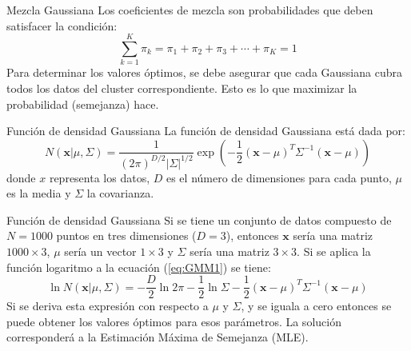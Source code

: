 \documentclass[11pt,aspectratio=169]{beamer}
\begin{document}
\begin{frame}{Mezcla Gaussiana}
Los coeficientes de mezcla son probabilidades que deben satisfacer la condición:
\begin{equation}
	\sum_{k=1}^K \pi_k = \pi_1 + \pi_2 + \pi_3 + \cdots + \pi_K = 1
\end{equation}
Para determinar los valores óptimos, se debe asegurar que cada Gaussiana cubra todos los datos del cluster correspondiente. Esto es lo que 
maximizar la probabilidad (semejanza) hace.
\end{frame}

\begin{frame}{Función de densidad Gaussiana}
La función de densidad Gaussiana está dada por:
\begin{equation}
	N(\textbf{x}|\mu,\Sigma) = \dfrac{1}{(2\pi)^{D/2}|\Sigma|^{1/2}}\exp\left(-\dfrac{1}{2}(\textbf{x}-\mu)^T\Sigma^{-1}(\textbf{x}-\mu) \right)
	\label{eq:GMM1}
\end{equation}
donde $x$ representa los datos, $D$ es el número de dimensiones para cada punto, $\mu$ es la media y $\Sigma$ la covarianza.
\end{frame}

\begin{frame}{Función de densidad Gaussiana}
Si se tiene un conjunto de datos compuesto de $N=1000$ puntos en tres dimensiones ($D=3$), entonces $\textbf{x}$ sería una matriz $1000\times 3$,
$\mu$ sería un vector $1\times 3$ y $\Sigma$ sería una matriz $3\times 3$. Si se aplica la función logaritmo a la ecuación (\ref{eq:GMM1}) se tiene:
\begin{equation}
	\ln N(\textbf{x}|\mu,\Sigma) = -\dfrac{D}{2}\ln 2\pi - \dfrac{1}{2}\ln\Sigma - \dfrac{1}{2}(\textbf{x}-\mu)^T\Sigma^{-1}(\textbf{x}-\mu)
\end{equation}
Si se deriva esta expresión con respecto a $\mu$ y $\Sigma$, y se iguala a cero entonces se puede obtener los valores óptimos para esos parámetros. 
La solución corresponderá a la Estimación Máxima de Semejanza (MLE).
\end{frame}
\end{document}
